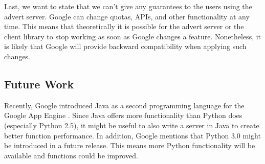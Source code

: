 Last, we want to state that we can't give any guarantees to the users using the
advert server. Google can change quotas, APIs, and other functionality at any
time. This means that theoretically it is possible for the advert server or the
client library to stop working as soon as Google changes a feature.
Nonetheless, it is likely that Google will provide backward compatibility when
applying such changes.

\subsection{Future Work}
\label{conclusion-future}
Recently, Google introduced Java as a second programming language for the
Google App Engine \cite{app-engine-java}. Since Java offers more functionality
than Python does (especially Python 2.5), it might be useful to also write a
server in Java to create better function performance. In addition, Google
mentions that Python 3.0 might be introduced in a future release. This means
more Python functionality will be available and functions could be improved.
